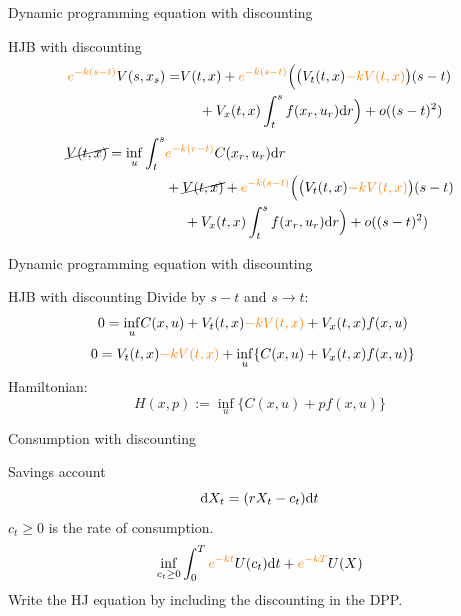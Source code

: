 \documentclass[color=usenames,dvipsnames]{beamer}
\newcommand{\dd}{\text{\normalfont d}}
\newcommand{\dt}{\text{\normalfont d}t}
\newcommand{\dr}{\text{\normalfont d}r}
\begin{document}
\begin{frame}{Dynamic programming equation with discounting}
        \begin{block}
        {HJB with discounting}
        \[
        \begin{split}
             {\color{orange}e^{-k(s-t)}}V(s,x_s) = &V(t,x) + {\color{orange}e^{-k(s-t)}}\Big(\big(V_t(t,x) {\color{orange}- k V(t,x)}\big)(s-t)\\
             &~~~~+ V_x(t,x)\int_t^s f(x_r,u_r)\dr\Big) + o((s-t)^2)
        \end{split}
        \]
        \[
        \begin{split}
            \cancel{V(t,x)}=\inf_{u}\int_t^s &{\color{orange}e^{-k(r-t)}}C(x_r,u_r)\dr \\
            &+ \cancel{V(t,x)} + {\color{orange}e^{-k(s-t)}}\Big(\big(V_t(t,x) {\color{orange}- k V(t,x)}\big)(s-t)\\
             &~~~~+ V_x(t,x)\int_t^s f(x_r,u_r)\dr\Big) + o((s-t)^2)
        \end{split}
        \]
    \end{block}
\end{frame}

\begin{frame}{Dynamic programming equation with discounting}
        \begin{block}
        {HJB with discounting}
        Divide by $s-t$ and $s\to t$:
        \[
        \begin{split}
            0=\inf_{u} &C(x,u) + V_t(t,x) {\color{orange}- k V(t,x)}+ V_x(t,x)f(x,u)
        \end{split}
        \]
        \[
        \begin{split}
            0= V_t(t,x) {\color{orange}- k V(t,x)}+\inf_{u} &\{C(x,u) + V_x(t,x)f(x,u)\}
        \end{split}
        \]
        Hamiltonian: 
        \[
        H(x,p):= \inf_{u} \{C(x,u) + pf(x,u)\}
        \]
    \end{block}
\end{frame}


\begin{frame}{Consumption with discounting}
    \begin{block}
        {Savings account}
        \[
        \dd{X}_t = (rX_t - c_t)\dt
        \]
        $c_t\ge0$ is the rate of consumption.
        \[
        \inf_{c_t\ge0} \int_0^T {\color{orange}e^{-kt}}U(c_t)\dt + {\color{orange}e^{-kT}}U(X)
        \]
        Write the HJ equation by including the discounting in the DPP.
    \end{block}
\end{frame}
\end{document}
